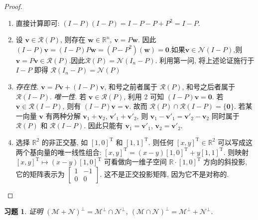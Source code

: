 \documentclass[UTF8]{ctexart}
\newtheorem{ex}[thm]{习题}
\begin{document}
\begin{proof}
\begin{enumerate}
\item 直接计算即可: \((I - P)(I - P) = I - P - P + P^{2} = I - P\).
\item 设 \(\boldsymbol{v} \in \mathcal{R}(P)\), 则存在 \(\boldsymbol{w} \in \mathbb{R}^{n}\), \(\boldsymbol{v} = P\boldsymbol{w}\).
因此 \((I-P)\boldsymbol{v} = (I-P)P\boldsymbol{w} = (P-P^{2})(\boldsymbol{w}) = \boldsymbol{0}\).如果$\boldsymbol{v} \in \mathcal{N}(I-P)$,则$\boldsymbol{v}=P\boldsymbol{v}\in\mathcal{R}(P)$.因此$\mathcal{R}(P)=\mathcal{N}(I_n-P)$.
利用第一问, 将上述论证施行于 \(I-P\) 即得 \(\mathcal{R}(I_{n}-P) = \mathcal{N}(P)\)
\item \emph{存在性}. \(\boldsymbol{v} = P\boldsymbol{v} + (I-P)\boldsymbol{v}\),
和号之前者属于 \(\mathcal{R}(P)\), 和号之后者属于 \(\mathcal{R}(I-P)\).
\emph{唯一性}. 若 \(\boldsymbol{v} \in \mathcal{R}(P)\), 利用 2 可知 \((I-P)\boldsymbol{v}=\boldsymbol{0}\).
若 \(\boldsymbol{v} \in \mathcal{R}(I-P)\), 则有 \((I-P)\boldsymbol{v}=\boldsymbol{v}\). 故而 \(\mathcal{R}(P) \cap \mathcal{R}(I-P) = \{\boldsymbol{0}\}\).
若某一向量 \(\boldsymbol{v}\) 有两种分解 \(\boldsymbol{v}_{1} + \boldsymbol{v}_{2}\), \(\boldsymbol{v}'_{1} + \boldsymbol{v}'_{2}\), 则 \(\boldsymbol{v}_1-\boldsymbol{v}'_{1}=\boldsymbol{v}'_{2}-\boldsymbol{v}_{2}\)
同时属于 \(\mathcal{R}(P)\) 和 \(\mathcal{R}(I-P)\). 因此只能有 \(\boldsymbol{v}_{1} = \boldsymbol{v}'_{1}\), \(\boldsymbol{v}_{2} = \boldsymbol{v}'_{2}\).
\item 选择 \(\mathbb{R}^{2}\) 的非正交基, 如 \([1,0]^{\mathrm{T}}\)
和 \([1,1]^{\mathrm{T}}\). 则任何 \([x,y]^{\mathrm{T}} \in \mathbb{R}^{2}\)
可以写成这两个基向量的唯一线性组合:
\([x,y]^{\mathrm{T}} = (x-y)[1,0]^{\mathrm{T}} + y [1,1]^{\mathrm{T}}\).
则映射 \([x,y]^{\mathrm{T}} \mapsto (x-y)[1,0]^{\mathrm{T}}\) 可看做向一维子空间 \(\mathbb{R}\cdot [1,0]^{\mathrm{T}}\)
方向的斜投影, 它的矩阵表示为 \(\left[\begin{smallmatrix} 1 & -1 \\ 0 & 0 \end{smallmatrix}\right]\). 这不是正交投影矩阵, 因为它不是对称的.
\end{enumerate}
\end{proof}

\begin{ex}
  证明 \((\mathcal{M}+\mathcal{N})^{\perp} = \mathcal{M}^{\perp} \cap \mathcal{N}^{\perp}\), \((\mathcal{M}\cap \mathcal{N})^{\perp} = \mathcal{M}^{\perp} + \mathcal{N}^{\perp}\).
\end{ex}
\end{document}
